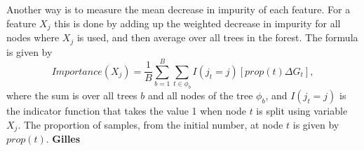  Another way is to measure the mean decrease in impurity of each feature. For a feature $X_j$ this is done by adding up the weighted decrease in impurity for all nodes where $X_j$ is used, and then average over all trees in the forest. The formula is given by 
 \begin{equation}
 	Importance(X_j) = \frac{1}{B} \sum_{b= 1}^{B}\sum_{t \in \phi_b} I(j_t =j)\left[prop(t)\Delta G_t\right],
 \end{equation}
where the sum is over all trees $b$ and all nodes of the tree $\phi_b$, and $I(j_t =j)$ is the indicator function that takes the value 1 when node $t$ is split using variable $X_j$. The proportion of samples, from the initial number, at node $t$ is given by $prop(t)$. \textbf{Gilles} 
%
 
